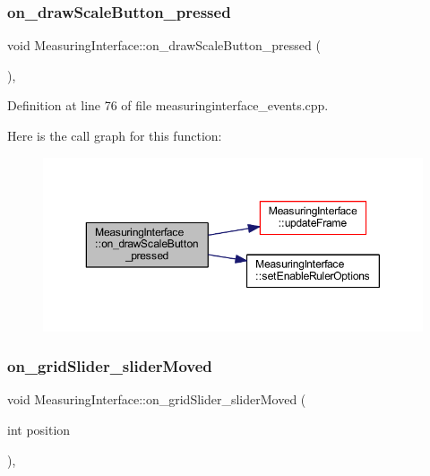 \subsubsection{\texorpdfstring{on\_drawScaleButton\_pressed}{on\_drawScaleButton\_pressed}}
{\footnotesize\ttfamily void Measuring\+Interface\+::on\+\_\+draw\+Scale\+Button\+\_\+pressed (\begin{DoxyParamCaption}{ }\end{DoxyParamCaption})\hspace{0.3cm}{\ttfamily [private]}, {\ttfamily [slot]}}



Definition at line 76 of file measuringinterface\+\_\+events.\+cpp.

Here is the call graph for this function\+:
\nopagebreak
\begin{figure}[H]
\begin{center}
\leavevmode
\includegraphics[width=350pt]{classMeasuringInterface_a310c3915895175fe1dc14d9234095de0_cgraph}
\end{center}
\end{figure}
\mbox{\label{classMeasuringInterface_a5f9322ce550b248eeac9cf9cd35b6400}} 
\subsubsection{\texorpdfstring{on\_gridSlider\_sliderMoved}{on\_gridSlider\_sliderMoved}}
{\footnotesize\ttfamily void Measuring\+Interface\+::on\+\_\+grid\+Slider\+\_\+slider\+Moved (\begin{DoxyParamCaption}\item[{int}]{position }\end{DoxyParamCaption})\hspace{0.3cm}{\ttfamily [private]}, {\ttfamily [slot]}}



